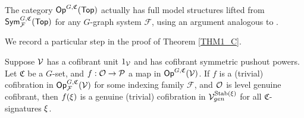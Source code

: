 \documentclass[a4paper,10pt
,draft
]{article}%
\renewcommand{\F}{\mathcal F}
\renewcommand{\1}{\eta}%
\begin{document}
\begin{remark}
      \label{TOP_FULL_REM}
      The category $\mathsf{Op}^{G,\mathfrak C}(\mathsf{Top})$ actually has full model structures lifted from $\Sym^{G, \mathfrak C}_\F(\Top)$
      for any $G$-graph system $\F$,
      using an argument analogous to \cite[Thm. 3.1]{GW}.
\end{remark}

We record a particular step in the proof of Theorem \ref{THM1_C}.
\begin{corollary}
      \label{LGC_COR}
      Suppose $\mathcal V$ has a cofibrant unit $1_{\mathcal V}$ and has cofibrant symmetric pushout powers.
      Let $\mathfrak C$ be a $G$-set, and $f: \mathcal{O} \to \mathcal{P}$ a map in $\mathsf{Op}^{G,\mathfrak C}(\mathcal V)$.
      If $f$ is a (trivial) cofibration in $\Op^{G, \mathfrak C}_\F(\V)$ for some indexing family $\F$,
      and $\mathcal{O}$ is level genuine cofibrant, then
      $f(\xi)$ is a genuine (trivial) cofibration in $\mathcal V^{\mathrm{Stab}(\xi)}_{gen}$ for all $\mathfrak C$-signatures $\xi$.
\end{corollary}
      
\end{document}
